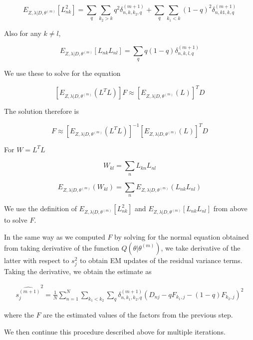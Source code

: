 \documentclass[12pt]{article}
\begin{document}
$$ E_{ Z, \lambda | D, \theta^{(m)}} \left [ L^2_{nk} \right ] = \sum_{q}  \sum_{k_2 > k} q^2 \delta^{(m+1)}_{n,k,k_2, q}  + \sum_{q}  \sum_{k_1 < k} (1-q)^2 \delta^{(m+1)}_{n,k1,k,q} $$

Also for any $k \neq l$,

$$ E_{ Z, \lambda | D, \theta^{(m)}} \left [ L_{nk}L_{nl} \right ] =
\sum_{q} q(1-q) \delta^{(m+1)}_{n,k,l,q} $$

We use these to solve for the equation

$$ \left [ E_{ Z, \lambda | D, \theta^{(m)}} \left( L^{T}L \right ) \right ] F \approx \left [ E_{ Z, \lambda | D, \theta^{(m)}} (L) \right] ^{T} D $$

The solution therefore is 

$$ F \approx \left [ E_{ Z, \lambda | D, \theta^{(m)}} \left( L^{T}L \right ) \right]^{-1} \left [ E_{ Z, \lambda | D, \theta^{(m)}} (L) \right]^{T} D $$

For $W = L^{T}L$

$$ W_{kl} = \sum_{n} L_{kn}L_{nl} $$

$$ E_{ Z, \lambda | D, \theta^{(m)}} \left ( W_{kl} \right ) = \sum_{n}  E_{ Z, \lambda | D, \theta^{(m)}} \left ( L_{nk}L_{nl} \right) $$

We use the definition of $E_{ Z, \lambda | D, \theta^{(m)}} \left [ L^2_{nk} \right ]$ 
and $E_{ Z, \lambda | D, \theta^{(m)}} \left [ L_{nk}L_{nl} \right ]$ 
from above to solve $F$. 

In the same way as we computed $F$ by solving for the normal equation obtained from taking derivative of the function $Q (\theta | \theta^{(m)})$, we take derivative of the latter with respect to $s^2_{j}$ to obtain EM updates of the residual variance terms. Taking the derivative, we obtain the estimate as 

\begin{eqnarray}
\widehat{s_{j}^{(m+1)}}^2 = \frac{1}{N}\sum_{n=1}^{N} \sum_{k_1 < k_2} \sum_{q} \delta^{(m+1)}_{n, k_1, k_2, q} (D_{nj} - q F_{k_1,j} - (1-q) F_{k_2,j})^2
\end{eqnarray}

where the $F$ are the estimated values of the factors from the previous step.

We then continue this procedure described above for multiple iterations.
\end{document}
